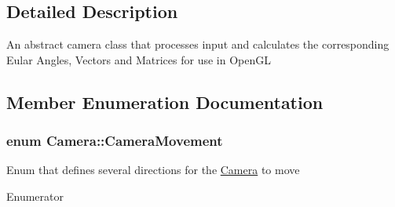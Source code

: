\subsection{Detailed Description}
An abstract camera class that processes input and calculates the corresponding Eular Angles, Vectors and Matrices for use in Open\+GL 

\subsection{Member Enumeration Documentation}
\subsubsection[{\texorpdfstring{Camera\+Movement}{CameraMovement}}]{\setlength{\rightskip}{0pt plus 5cm}enum {\bf Camera\+::\+Camera\+Movement}}\hypertarget{classCamera_a9825f2bf1ddc209c3b2d336080d8407a}{}\label{classCamera_a9825f2bf1ddc209c3b2d336080d8407a}
Enum that defines several directions for the \hyperlink{classCamera}{Camera} to move \begin{Desc}
\item[Enumerator]\par
\begin{description}
\item[{\em 
F\+O\+R\+W\+A\+RD\hypertarget{classCamera_a9825f2bf1ddc209c3b2d336080d8407aa6388b5408cf8440021383388044ae77f}{}\label{classCamera_a9825f2bf1ddc209c3b2d336080d8407aa6388b5408cf8440021383388044ae77f}
}]\item[{\em 
B\+A\+C\+K\+W\+A\+RD\hypertarget{classCamera_a9825f2bf1ddc209c3b2d336080d8407aae18db08a2289896f26dcddf6e2ad274f}{}\label{classCamera_a9825f2bf1ddc209c3b2d336080d8407aae18db08a2289896f26dcddf6e2ad274f}
}]\item[{\em 
L\+E\+FT\hypertarget{classCamera_a9825f2bf1ddc209c3b2d336080d8407aa1bed5588ea4c26163a72f0fc8621f6be}{}\label{classCamera_a9825f2bf1ddc209c3b2d336080d8407aa1bed5588ea4c26163a72f0fc8621f6be}
}]\item[{\em 
R\+I\+G\+HT\hypertarget{classCamera_a9825f2bf1ddc209c3b2d336080d8407aaedac3a8506bf2bae7df2d36dd5580884}{}\label{classCamera_a9825f2bf1ddc209c3b2d336080d8407aaedac3a8506bf2bae7df2d36dd5580884}
}]\end{description}
\end{Desc}


